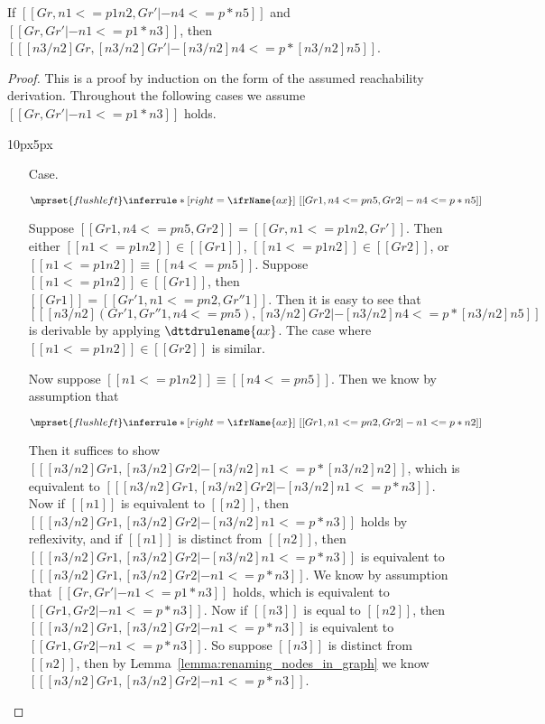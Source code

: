 \begin{lemma}
  \label{lemma:node_substitution_for_reachability}
  If $[[Gr, n1 <=p1 n2,Gr' |-n4 <=p* n5]]$ and $[[Gr, Gr' |- n1 <=p1* n3]]$, then 
  $[[ [n3/n2]Gr,[n3/n2]Gr' |- [n3/n2]n4 <=p* [n3/n2]n5]]$. 
\end{lemma}
\begin{proof}
  This is a proof by induction on the form of the assumed reachability
  derivation.  Throughout the following cases we assume $[[Gr, Gr' |-
  n1 <=p1* n3]]$ holds.
  \vspace{-25px}
  \begin{changemargin}{10px}{5px}\noindent
  \begin{itemize}
  \item[Case.]\ \\ 
    \begin{center}
      \begin{math}
        $$\mprset{flushleft}
        \inferrule* [right=\ifrName{ax}] {
          \ 
        }{[[Gr1 , n4 <= p n5 , Gr2 |- n4 <= p * n5]]}
      \end{math}
    \end{center}
    Suppose $[[Gr1, n4 <= p n5, Gr2]] = [[Gr, n1 <=p1 n2,Gr']]$.  Then
    either $[[n1 <=p1 n2]] \in [[Gr1]]$, $[[n1 <=p1 n2]] \in [[Gr2]]$,
    or $[[n1 <=p1 n2]] \equiv [[n4 <=p n5]]$.  Suppose $[[n1 <=p1 n2]] \in [[Gr1]]$,
    then $[[Gr1]] = [[Gr'1, n1 <=p n2,Gr''1]]$.  Then it is easy to see that\\
    $[[ [n3/n2](Gr'1,Gr''1 , n4 <= p n5) , [n3/n2]Gr2 |- [n3/n2]n4 <= p * [n3/n2]n5]]$
    is derivable by applying $\dttdrulename{\normalsize ax}$.  The case where $[[n1 <=p1 n2]] \in [[Gr2]]$ is
    similar.

    Now suppose $[[n1 <=p1 n2]] \equiv [[n4 <=p n5]]$.  Then we know by assumption that 
    \begin{center}
      \begin{math}
        $$\mprset{flushleft}
        \inferrule* [right=\ifrName{ax}] {
          \ 
        }{[[Gr1 , n1 <= p n2 , Gr2 |- n1 <= p * n2]]}
      \end{math}
    \end{center}
    Then it suffices to show $[[ [n3/n2]Gr1 , [n3/n2]Gr2 |- [n3/n2]n1 <= p * [n3/n2]n2]]$, which is equivalent
    to $[[ [n3/n2]Gr1 , [n3/n2]Gr2 |- [n3/n2]n1 <= p * n3]]$.  Now if $[[n1]]$ is equivalent to $[[n2]]$, then
    $[[ [n3/n2]Gr1 , [n3/n2]Gr2 |- [n3/n2]n1 <= p * n3]]$ holds by reflexivity, and if $[[n1]]$ is distinct from $[[n2]]$,
    then $[[ [n3/n2]Gr1 , [n3/n2]Gr2 |- [n3/n2]n1 <= p * n3]]$ is equivalent to 
    $[[ [n3/n2]Gr1 , [n3/n2]Gr2 |- n1 <= p * n3]]$.  We know by assumption that $[[Gr, Gr' |- n1 <=p1* n3]]$ holds, which
    is equivalent to $[[Gr1, Gr2 |- n1 <=p* n3]]$.  Now if $[[n3]]$ is equal to $[[n2]]$, then 
    $[[ [n3/n2]Gr1 , [n3/n2]Gr2 |- n1 <= p * n3]]$ is equivalent to $[[Gr1, Gr2 |- n1 <=p* n3]]$.  So suppose
    $[[n3]]$ is distinct from $[[n2]]$, then by Lemma~\ref{lemma:renaming_nodes_in_graph} we know 
    $[[ [n3/n2]Gr1 , [n3/n2]Gr2 |- n1 <= p * n3]]$.        
    

\end{itemize}
\end{changemargin}
\end{proof}
